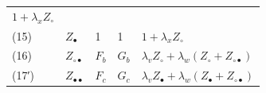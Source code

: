 \documentclass[10pt,]{article}
\begin{document}
\begin{longtable}[]{@{}lllll@{}}
\begin{minipage}[t]{0.17\columnwidth}
\(1+\lambda_xZ_\circ\)\strut
\end{minipage}\tabularnewline
\begin{minipage}[t]{0.17\columnwidth}\raggedright
(15)\strut
\end{minipage} & \begin{minipage}[t]{0.17\columnwidth}\raggedright
\(Z_\bullet\)\strut
\end{minipage} & \begin{minipage}[t]{0.17\columnwidth}\raggedright
1\strut
\end{minipage} & \begin{minipage}[t]{0.17\columnwidth}\raggedright
1\strut
\end{minipage} & \begin{minipage}[t]{0.17\columnwidth}\raggedright
\(1+\lambda_xZ_\circ\)\strut
\end{minipage}\tabularnewline
\begin{minipage}[t]{0.17\columnwidth}\raggedright
(16)\strut
\end{minipage} & \begin{minipage}[t]{0.17\columnwidth}\raggedright
\(Z_{\circ\bullet}\)\strut
\end{minipage} & \begin{minipage}[t]{0.17\columnwidth}\raggedright
\(F_b\)\strut
\end{minipage} & \begin{minipage}[t]{0.17\columnwidth}\raggedright
\(G_b\)\strut
\end{minipage} & \begin{minipage}[t]{0.17\columnwidth}\raggedright
\(\lambda_vZ_\circ+\lambda_w(Z_\circ+Z_{\circ\bullet})\)\strut
\end{minipage}\tabularnewline
\begin{minipage}[t]{0.17\columnwidth}\raggedright
(17′)\strut
\end{minipage} & \begin{minipage}[t]{0.17\columnwidth}\raggedright
\(Z_{\bullet\bullet}\)\strut
\end{minipage} & \begin{minipage}[t]{0.17\columnwidth}\raggedright
\(F_c\)\strut
\end{minipage} & \begin{minipage}[t]{0.17\columnwidth}\raggedright
\(G_c\)\strut
\end{minipage} & \begin{minipage}[t]{0.17\columnwidth}\raggedright
\(\lambda_vZ_\bullet+\lambda_w(Z_\bullet+Z_{\circ\bullet})\)\strut
\end{minipage}\tabularnewline
\bottomrule
\end{longtable}
\end{document}
